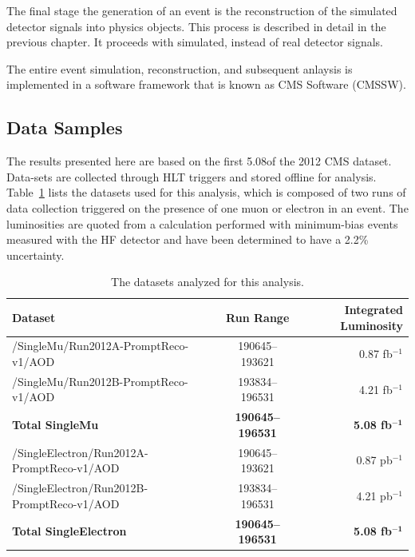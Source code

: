 \par The final stage the generation of an event is the reconstruction
of the simulated detector signals into physics objects.  This process
is described in detail in the previous chapter.  It proceeds with
simulated, instead of real detector signals.  

\par The entire event simulation, reconstruction, and subsequent
anlaysis is implemented in a software framework that is known as CMS
Software (CMSSW).  

\subsection{Data Samples}
\label{data_overview}

\par The results presented here are based on the first 5.08\fbinv of the
2012 CMS dataset.  Data-sets are collected through HLT triggers and
stored offline for analysis.  Table~\ref{tab:dataSamples} lists the datasets used
for this analysis, which is composed of two runs of data collection
triggered on the presence of one muon or electron in an event.
The luminosities are quoted from a calculation performed with
minimum-bias events measured with the HF detector and have been
determined to have a 2.2\% uncertainty.   

\begin{table}[hbtp]\footnotesize
\centering
\begin{tabular}{|l|c|r|}
\hline\hline
 Dataset & Run Range & Integrated Luminosity \\
\hline
/SingleMu/Run2012A-PromptReco-v1/AOD & 190645--193621 & 0.87 fb$^{-1}$ \\
/SingleMu/Run2012B-PromptReco-v1/AOD & 193834--196531 & 4.21 fb$^{-1}$ \\
{\bf Total SingleMu} & {\bf 190645--196531} & {\bf 5.08 fb$\mathbf{^{-1}}$} \\
\hline
/SingleElectron/Run2012A-PromptReco-v1/AOD & 190645--193621 & 0.87 pb$^{-1}$ \\
/SingleElectron/Run2012B-PromptReco-v1/AOD & 193834--196531 & 4.21 pb$^{-1}$ \\
{\bf Total SingleElectron} & {\bf 190645--196531} & {\bf 5.08 fb$\mathbf{^{-1}}$} \\
\hline\hline
\end{tabular}
\caption{The datasets analyzed for this analysis.}
\label{tab:dataSamples}
\end{table}

